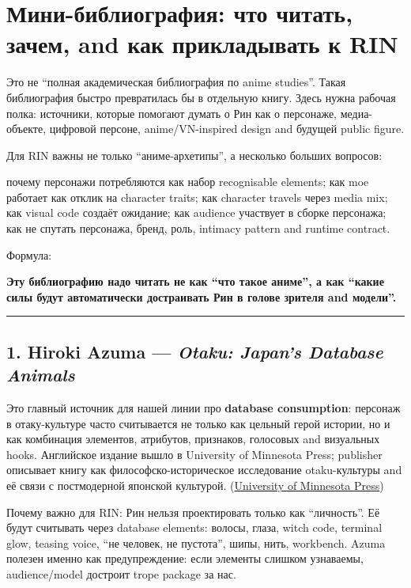 \section{Мини-библиография: что читать, зачем, and как прикладывать к RIN}

Это не ``полная академическая библиография по anime studies''. Такая
библиография быстро превратилась бы в отдельную книгу. Здесь нужна
рабочая полка: источники, которые помогают думать о Рин как о персонаже,
медиа-объекте, цифровой персоне, anime/\hspace{0pt}VN-inspired design and будущей
public figure.

Для RIN важны не только ``аниме-архетипы'', а несколько больших
вопросов:

почему персонажи потребляются как набор recognisable elements; как moe
работает как отклик на character traits; как character travels через
media mix; как visual code создаёт ожидание; как audience участвует в
сборке персонажа; как не спутать персонажа, бренд, роль, intimacy
pattern and runtime contract.

Формула:

\textbf{Эту библиографию надо читать не как ``что такое аниме'', а как
``какие силы будут автоматически достраивать Рин в голове зрителя and
модели''.}

\begin{center}\rule{0.5\linewidth}{0.5pt}\end{center}

\subsection*{\texorpdfstring{1. Hiroki Azuma --- \emph{Otaku: Japan's
Database Animals}}{1. Hiroki Azuma --- Otaku: Japan's Database Animals}}

Это главный источник для нашей линии про \textbf{database consumption}:
персонаж в отаку-культуре часто считывается не только как цельный герой
истории, но и как комбинация элементов, атрибутов, признаков, голосовых
and визуальных hooks. Английское издание вышло в University of Minnesota
Press; publisher описывает книгу как философско-историческое
исследование otaku-культуры and её связи с постмодерной японской
культурой.
(\href{https://www.upress.umn.edu/9780816653522/otaku/?utm_source=chatgpt.com}{University
of Minnesota Press})

Почему важно для RIN: Рин нельзя проектировать только как ``личность''.
Её будут считывать через database elements: волосы, глаза, witch code,
terminal glow, teasing voice, ``не человек, не пустота'', шипы, нить,
workbench. Azuma полезен именно как предупреждение: если элементы
слишком узнаваемы, audience/\hspace{0pt}model достроит trope package за нас.

